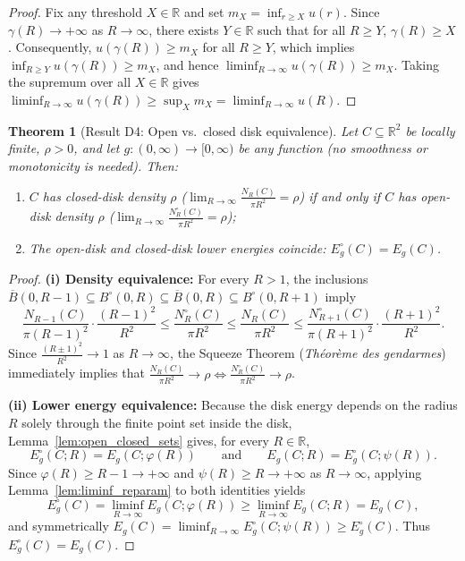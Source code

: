 \documentclass[11pt, a4paper]{article}
\newtheorem{theorem}{Theorem}[section]
\theoremstyle{definition}
\theoremstyle{remark}
\newcommand{\R}{\mathbb{R}}
\newcommand{\Bbar}{\overline{B}}
\newcommand{\Bopen}{B^{\circ}}
\begin{document}
\begin{proof}
Fix any threshold $X \in \R$ and set $m_X = \inf_{r \ge X} u(r)$. Since $\gamma(R) \to +\infty$ as $R \to \infty$, there exists $Y \in \R$ such that for all $R \ge Y$, $\gamma(R) \ge X$. Consequently, $u(\gamma(R)) \ge m_X$ for all $R \ge Y$, which implies $\inf_{R \ge Y} u(\gamma(R)) \ge m_X$, and hence $\liminf_{R \to \infty} u(\gamma(R)) \ge m_X$. Taking the supremum over all $X \in \R$ gives $\liminf_{R \to \infty} u(\gamma(R)) \ge \sup_X m_X = \liminf_{R \to \infty} u(R)$.
\end{proof}

\begin{theorem}[Result D4: Open vs.\ closed disk equivalence]
\label{thm:D4}
Let $C \subseteq \R^2$ be locally finite, $\rho > 0$, and let $g : (0, \infty) \to [0, \infty)$ be any function (no smoothness or monotonicity is needed). Then:
\begin{enumerate}[label=(\roman*)]
    \item $C$ has closed-disk density $\rho$ ($\lim_{R \to \infty} \frac{N_R(C)}{\pi R^2} = \rho$) if and only if $C$ has open-disk density $\rho$ ($\lim_{R \to \infty} \frac{N_R^{\circ}(C)}{\pi R^2} = \rho$);
    \item The open-disk and closed-disk lower energies coincide: $E_g^{\circ}(C) = E_g(C)$.
\end{enumerate}
\end{theorem}

\begin{proof}
\textbf{(i) Density equivalence:} For every $R > 1$, the inclusions $\Bbar(0, R - 1) \subseteq \Bopen(0, R) \subseteq \Bbar(0, R) \subseteq \Bopen(0, R + 1)$ imply
\[
\frac{N_{R-1}(C)}{\pi (R-1)^2} \cdot \frac{(R-1)^2}{R^2} \le \frac{N_R^{\circ}(C)}{\pi R^2} \le \frac{N_R(C)}{\pi R^2} \le \frac{N_{R+1}^{\circ}(C)}{\pi (R+1)^2} \cdot \frac{(R+1)^2}{R^2}.
\]
Since $\frac{(R \pm 1)^2}{R^2} \to 1$ as $R \to \infty$, the Squeeze Theorem (\textit{Th\'eor\`eme des gendarmes}) immediately implies that $\frac{N_R(C)}{\pi R^2} \to \rho \iff \frac{N_R^{\circ}(C)}{\pi R^2} \to \rho$.

\noindent \textbf{(ii) Lower energy equivalence:} Because the disk energy depends on the radius $R$ solely through the finite point set inside the disk, Lemma~\ref{lem:open_closed_sets} gives, for every $R \in \R$,
\[
E_g^{\circ}(C; R) = E_g(C; \varphi(R)) \qquad \text{and} \qquad E_g(C; R) = E_g^{\circ}(C; \psi(R)).
\]
Since $\varphi(R) \ge R - 1 \to +\infty$ and $\psi(R) \ge R \to +\infty$ as $R \to \infty$, applying Lemma~\ref{lem:liminf_reparam} to both identities yields
\[
E_g^{\circ}(C) = \liminf_{R \to \infty} E_g(C; \varphi(R)) \ge \liminf_{R \to \infty} E_g(C; R) = E_g(C),
\]
and symmetrically $E_g(C) = \liminf_{R \to \infty} E_g^{\circ}(C; \psi(R)) \ge E_g^{\circ}(C)$. Thus $E_g^{\circ}(C) = E_g(C)$.
\end{proof}
\end{document}
